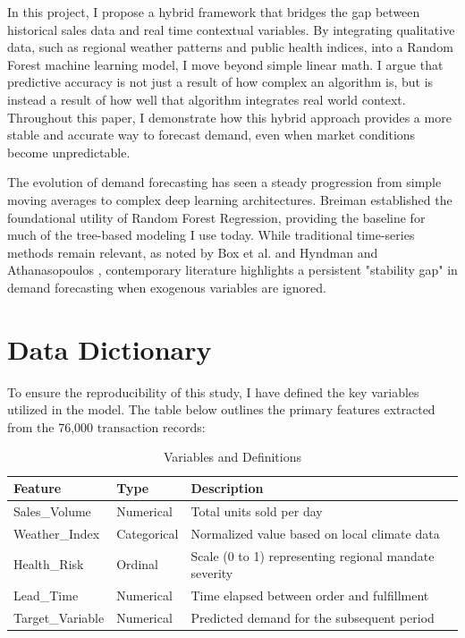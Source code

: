 \documentclass[12pt]{article}
\begin{document}
In this project, I propose a hybrid framework that bridges the gap between historical sales data and real time contextual variables. By integrating qualitative data, such as regional weather patterns and public health indices, into a Random Forest machine learning model, I move beyond simple linear math. I argue that predictive accuracy is not just a result of how complex an algorithm is, but is instead a result of how well that algorithm integrates real world context. Throughout this paper, I demonstrate how this hybrid approach provides a more stable and accurate way to forecast demand, even when market conditions become unpredictable.

The evolution of demand forecasting has seen a steady progression from simple moving averages to complex deep learning architectures. Breiman \cite{breiman2001} established the foundational utility of Random Forest Regression, providing the baseline for much of the tree-based modeling I use today. While traditional time-series methods remain relevant, as noted by Box et al. \cite{box2015} and Hyndman and Athanasopoulos \cite{hyndman2018}, contemporary literature highlights a persistent "stability gap" in demand forecasting when exogenous variables are ignored.

\section{Data Dictionary}
To ensure the reproducibility of this study, I have defined the key variables utilized in the model. The table below outlines the primary features extracted from the 76,000 transaction records:

\begin{table}[h]
\centering
\caption{Variables and Definitions}
\begin{tabular}{lll}
\toprule
Feature & Type & Description \\
\midrule
Sales\_Volume & Numerical & Total units sold per day \\
Weather\_Index & Categorical & Normalized value based on local climate data \\
Health\_Risk & Ordinal & Scale (0 to 1) representing regional mandate severity \\
Lead\_Time & Numerical & Time elapsed between order and fulfillment \\
Target\_Variable & Numerical & Predicted demand for the subsequent period \\
\bottomrule
\end{tabular}
\end{table}
\end{document}
